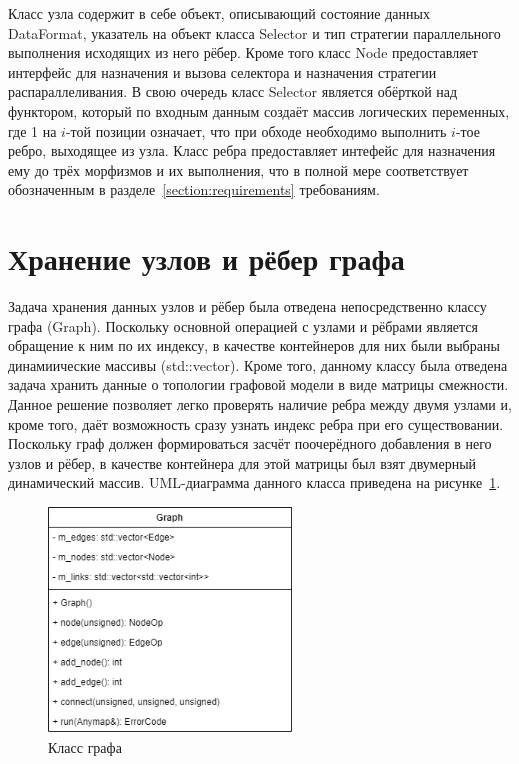 Класс узла содержит в себе объект, описывающий состояние данных \textsf{DataFormat}, указатель на объект класса \textsf{Selector} и тип стратегии параллельного выполнения исходящих из него рёбер. Кроме того класс \textsf{Node} предоставляет интерфейс для назначения и вызова селектора и назначения стратегии распараллеливания. В свою очередь класс \textsf{Selector} является обёрткой над функтором, который по входным данным создаёт массив логических переменных, где 1 на \(i\)-той позиции означает, что при обходе необходимо выполнить \(i\)-тое ребро, выходящее из узла. Класс ребра предоставляет интефейс для назначения ему до трёх морфизмов и их выполнения, что в полной мере соответствует обозначенным в разделе~\ref{section:requirements} требованиям.

\section{Хранение узлов и рёбер графа}
Задача хранения данных узлов и рёбер была отведена непосредственно классу графа (\textsf{Graph}). Поскольку основной операцией с узлами и рёбрами является обращение к ним по их индексу, в качестве контейнеров для них были выбраны динамиические массивы (\textsf{std::vector}). Кроме того, данному классу была отведена задача хранить данные о топологии графовой модели в виде матрицы смежности. Данное решение позволяет легко проверять наличие ребра между двумя узлами и, кроме того, даёт возможность сразу узнать индекс ребра при его существовании. Поскольку граф должен формироваться засчёт поочерёдного добавления в него узлов и рёбер, в качестве контейнера для этой матрицы был взят двумерный динамический массив. UML-диаграмма данного класса приведена на рисунке~\ref{fig:classGraph}.
\begin{figure}[!ht]
    \centering
    \includegraphics[height=6cm]{figures/class.graph.png}
    \caption{Класс графа}
    \label{fig:classGraph}
\end{figure}

